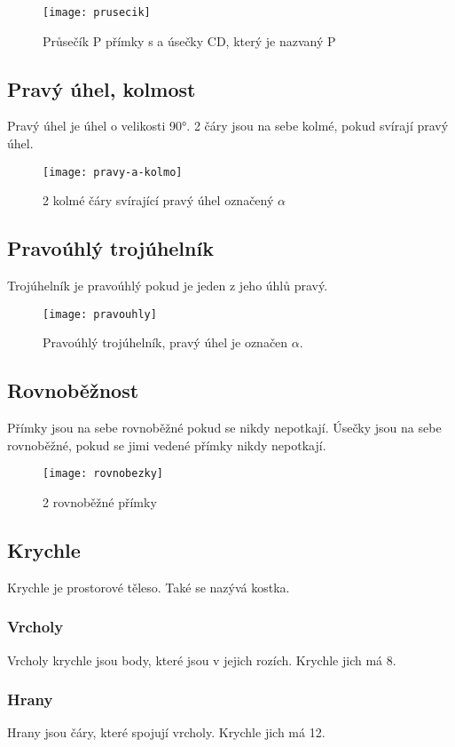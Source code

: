 \begin{figure}[h]
	\caption{Průsečík P přímky s a úsečky CD, který je nazvaný P}
	\centering
	\texttt{[image: prusecik]}
\end{figure}


\subsection{Pravý úhel, kolmost}
Pravý úhel je úhel o velikosti 90°. 2 čáry jsou na sebe kolmé, pokud svírají pravý úhel.

\begin{figure}[h]
	\caption{2 kolmé čáry svírající pravý úhel označený $\alpha$}
	\centering
	\texttt{[image: pravy-a-kolmo]}
\end{figure}

\subsection{Pravoúhlý trojúhelník}
Trojúhelník je pravoúhlý pokud je jeden z jeho úhlů pravý.

\begin{figure}[h]
	\caption{Pravoúhlý trojúhelník, pravý úhel je označen $\alpha$.}
	\centering
	\texttt{[image: pravouhly]}
\end{figure}

\subsection{Rovnoběžnost}
Přímky jsou na sebe rovnoběžné pokud se nikdy nepotkají. Úsečky jsou na sebe rovnoběžné, pokud se jimi vedené přímky nikdy nepotkají.

\begin{figure}[h]
	\caption{2 rovnoběžné přímky}
	\centering
	\texttt{[image: rovnobezky]}
\end{figure}

\subsection{Krychle}
Krychle je prostorové těleso. Také se nazývá kostka.
\subsubsection{Vrcholy}
Vrcholy krychle jsou body, které jsou v jejich rozích. Krychle jich má 8.
\subsubsection{Hrany}
Hrany jsou čáry, které spojují vrcholy. Krychle jich má 12.
